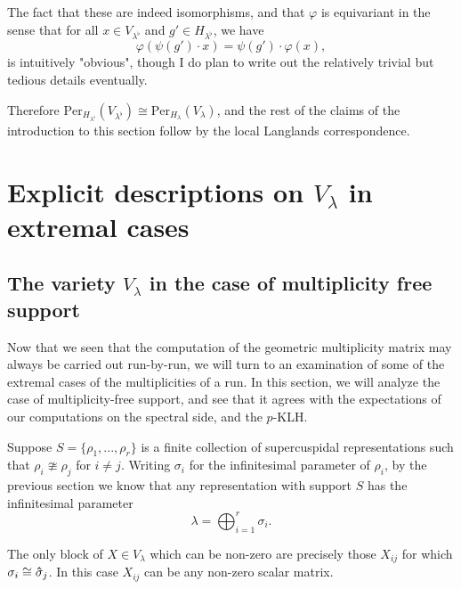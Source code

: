 \documentclass{memoir}
\newcommand{\lb}{\left(}
\newcommand{\rb}{\right)}
\newcommand{\tx}{\text}
\newcommand{\vi}{\varphi}
\theoremstyle{definition}
\begin{document}
	The fact that these are indeed isomorphisms, and that $\vi$ is equivariant in the sense that for all $x\in V_{\lambda^\flat}$ and $g'\in H_{\lambda^\flat}$, we have
	$$\vi\lb \psi(g')\cdot x\rb=\psi(g')\cdot\vi(x),$$
	is intuitively "obvious", though I do plan to write out the relatively trivial but tedious details eventually. 
	
	Therefore $\tx{Per}_{H_{\lambda^\flat}}(V_{\lambda^\flat})\cong\tx{Per}_{H_\lambda}(V_{\lambda})$, and the rest of the claims of the introduction to this section follow by the local Langlands correspondence.  
	
	
	
	
	
	
	
	
	
	
	
	
	
	
	
	
	
	
	
	
	
	
	
	
	\section{Explicit descriptions on $V_\lambda$ in extremal cases}

	\subsection{The variety $V_\lambda$ in the case of multiplicity free support}
	
	Now that we seen that the computation of the geometric multiplicity matrix may always be carried out run-by-run, we will turn to an examination of some of the extremal cases of the multiplicities of a run.  
	In this section, we will analyze the case of multiplicity-free support, and see that it agrees with the expectations of our computations on the spectral side, and the $p$-KLH.  
	
	Suppose $S=\{\rho_1, ..., \rho_r\}$ is a finite collection of supercuspidal representations such that $\rho_i\ncong\rho_j$ for $i\neq j$.  
	Writing $\sigma_i$ for the infinitesimal parameter of $\rho_i$, by the previous section we know that any representation with support $S$ has the infinitesimal parameter
	$$\lambda=\bigoplus_{i=1}^r\sigma_i.$$
	
	The only block of $X\in V_\lambda$ which can be non-zero are precisely those $X_{ij}$ for which $\sigma_i\cong\vu\sigma_j$.  
	In this case $X_{ij}$ can be any non-zero scalar matrix.  
	
\end{document}
